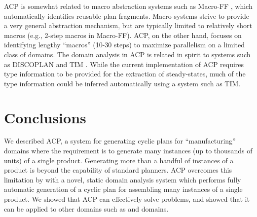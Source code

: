 ACP is somewhat related to  macro abstraction systems such as 
Macro-FF \cite{Botea2005}, which automatically
identifies reusable plan fragments. Macro systems strive to provide
a very general abstraction mechanism, but are typically limited to relatively short macros (e.g., 2-step macros in Macro-FF). 
ACP, on the other  hand, focuses on identifying  lengthy ``macros'' (10-30 steps) to maximize parallelism on a limited class of domains.
%
The domain analysis in ACP is related in spirit
to systems such as DISCOPLAN \cite{GereviniS98} and TIM
\cite{Fox1998}. %
While the current implementation of ACP requires type information to be provided for the \domind extraction of steady-states, much of the type information could be inferred automatically using a system such as TIM.






\section{Conclusions}
\label{sec-5}


We described ACP, a \domind system for generating cyclic plans for
``manufacturing'' domains where the requirement is to generate many
instances (up to thousands of units) of a single product.  %
Generating more than a
handful of instances of a product is beyond the capability of
standard \domind planners. ACP overcomes this limitation by
with a novel, static domain analysis system which performs 
fully automatic generation of a cyclic plan for assembling many
instances of a single product.
We showed that ACP can effectively solve \ca problems, and showed that it can be applied to other domains such as  \ww and \barm
domains. %

